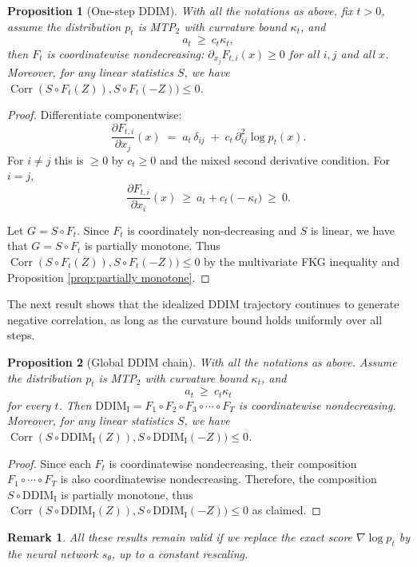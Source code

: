 \documentclass[12pt]{article}
\newcommand{\0}{\mathbf{0}}
\DeclareMathOperator{\Corr}{Corr}
\newcommand{\DDIMIdeal}{\mathrm{DDIM}_{\mathrm{I}}}
\newtheorem{remark}{Remark}
\newtheorem{prop}{Proposition}
\begin{document}
\begin{prop}[One-step DDIM]\label{prop:fkg-onestep}
\label{lem:isotone-step}
With all the notations as above, fix $t>0$,
assume the distribution $p_t$ is MTP$_2$ with curvature bound $\kappa_t$, and 
\[
a_t\ \ge\ c_t\kappa_t,
\]
then $F_t$ is coordinatewise nondecreasing: $\partial_{x_j}F_{t,i}(x)\ge 0$ for all $i,j$ and all $x$. Moreover, for any linear statistics $S$, we have $\Corr(S\circ F_t(Z)), S\circ F_t(-Z)) \leq  0$.
\end{prop}

\begin{proof}
Differentiate componentwise:
\[
\frac{\partial F_{t,i}}{\partial x_j}(x)\;=\;a_t\,\delta_{ij}\;+\;c_t\,\partial_{ij}^2 \log p_t(x).
\]
For $i\neq j$ this is $\ge 0$ by $c_t\ge 0$ and the mixed second derivative condition. For $i=j$,
\[
\frac{\partial F_{t,i}}{\partial x_i}(x)\ \ge\ a_t+c_t\,\big(-\kappa_t\big)\ \ge\ 0.
\]

Let $G = S\circ F_t$. Since $F_t$ is coordinately non-decreasing and $S$ is linear, we have that $G = S\circ F_t$ is partially monotone. Thus 
$\Corr(S\circ F_t(Z)), S\circ F_t(-Z)) \leq  0$ by the multivariate FKG inequality and Proposition \ref{prop:partially monotone}.
\end{proof}

The next result shows that the idealized DDIM trajectory continues to generate negative correlation, as long as the curvature bound holds uniformly over all steps.


\begin{prop}[Global DDIM chain]\label{prop:fkg-global}
With all the notations as above. Assume the distribution $p_t$ is MTP$_2$ with curvature bound $\kappa_t$, and 
\[
a_t\ \ge\ c_t\kappa_t
\]
for every $t$. Then $\DDIMIdeal =  F_1 \circ F_2 \circ F_3 \circ \cdots \circ F_T$ is coordinatewise nondecreasing. Moreover, for any linear statistics $S$, we have $\Corr(S\circ \DDIMIdeal(Z)), S\circ \DDIMIdeal(-Z)) \leq  0$.
\end{prop}

\begin{proof}
Since each $F_t$ is coordinatewise nondecreasing, their composition
$F_1 \circ \cdots \circ F_T$ is also coordinatewise nondecreasing.
Therefore, the composition $S\circ \DDIMIdeal$ is partially monotone, thus $\Corr(S\circ \DDIMIdeal(Z)), S\circ \DDIMIdeal(-Z)) \leq  0$ as claimed.
\end{proof}

\begin{remark}
All these results remain valid if we replace the exact score $\nabla \log p_t$ by the neural network $s_\theta$, up to a constant rescaling.
\end{remark}
\end{document}
